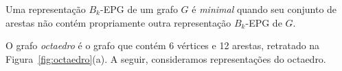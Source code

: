 


\begin{definition}
Uma representação $B_k$-EPG de um grafo $G$ é \emph{minimal} quando seu conjunto de arestas não contém propriamente outra representação $B_k$-EPG de $G$.
\end{definition}

O grafo \textit{octaedro} é o grafo que contém  6 vértices e 12 arestas, retratado na  Figura~\ref{fig:octaedro}(a). A seguir, consideramos  representações do octaedro.

